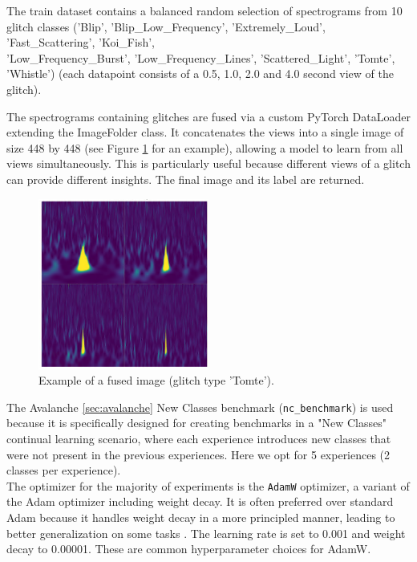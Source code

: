 The train dataset contains a balanced random selection of spectrograms from 10 glitch classes ('Blip', 'Blip\_Low\_Frequency', 'Extremely\_Loud', 'Fast\_Scattering', 'Koi\_Fish', \\
'Low\_Frequency\_Burst', 'Low\_Frequency\_Lines', 'Scattered\_Light', 'Tomte', 'Whistle')
(each datapoint consists of a 0.5, 1.0, 2.0 and 4.0 second view of the glitch). 

The spectrograms containing glitches are fused via a custom PyTorch DataLoader extending the ImageFolder class. It concatenates the views into a single image of size 448 by 448 (see Figure \ref{fig:fused_image_tomte} for an example), allowing a model to learn from all views simultaneously. This is particularly useful because different views of a glitch can provide different insights. The final image and its label are returned. 

\begin{figure}[H]
    \centering
    \includegraphics[width=0.5\textwidth]{Images/FusedImage_Tomte.png}
    \caption{Example of a fused image (glitch type 'Tomte').}
    \label{fig:fused_image_tomte}
\end{figure}

The Avalanche \ref{sec:avalanche} New Classes benchmark (\verb|nc_benchmark|) is used because it is specifically designed for creating benchmarks in a "New Classes" continual learning scenario, where each experience introduces new classes that were not present in the previous experiences. Here we opt for 5 experiences (2 classes per experience). \\


The optimizer for the majority of experiments is the \verb|AdamW| optimizer, a variant of the Adam optimizer including weight decay. It is often preferred over standard Adam because it handles weight decay in a more principled manner, leading to better generalization on some tasks \citep{loshchilov2019decoupled}. The learning rate is set to 0.001 and weight decay to 0.00001. These are common hyperparameter choices for AdamW. \\



